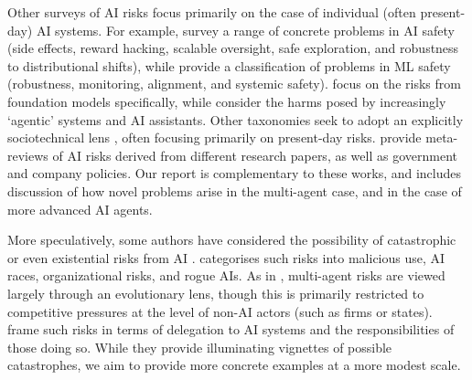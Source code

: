 Other surveys of AI risks focus primarily on the case of individual (often present-day) AI systems.
For example, \citet{Amodei2016} survey a range of concrete problems in AI safety (side effects, reward hacking, scalable oversight, safe exploration, and robustness to distributional shifts), while \citet{Hendrycks2021} provide a classification of problems in ML safety (robustness, monitoring, alignment, and systemic safety).
\citet{Anwar2024,Bommasani2021-dy,Weidinger2022,Bird2023} focus on the risks from foundation models specifically, while \citet{Chan2023-aj,Gabriel2024} consider the harms posed by increasingly `agentic' systems and AI assistants.
Other taxonomies seek to adopt an explicitly sociotechnical lens \citep{shelby_sociotechnical_2023,Abercrombie2024,Weidinger2023a}, often focusing primarily on present-day risks.
\citet{Zeng2024,Uuk2025} provide meta-reviews of AI risks derived from different research papers, as well as government and company policies.
Our report is complementary to these works, and includes discussion of how novel problems arise in the multi-agent case, and in the case of more advanced AI agents.

More speculatively, some authors have considered the possibility of catastrophic or even existential risks from AI \citep{Turchin2018,Bostrom2014,Ord2020,Kasirzadeh2024}.
\citet{Hendrycks2023} categorises such risks into malicious use, AI races, organizational risks, and rogue AIs.
As in \citet{hendrycks_natural_2023}, multi-agent risks are viewed largely through an evolutionary lens, though this is primarily restricted to competitive pressures at the level of non-AI actors (such as firms or states).
\citet{Critch2020,critch2023tasra} frame such risks in terms of delegation to AI systems and the responsibilities of those doing so.
While they provide illuminating vignettes of possible catastrophes, we aim to provide more concrete examples at a more modest scale.


